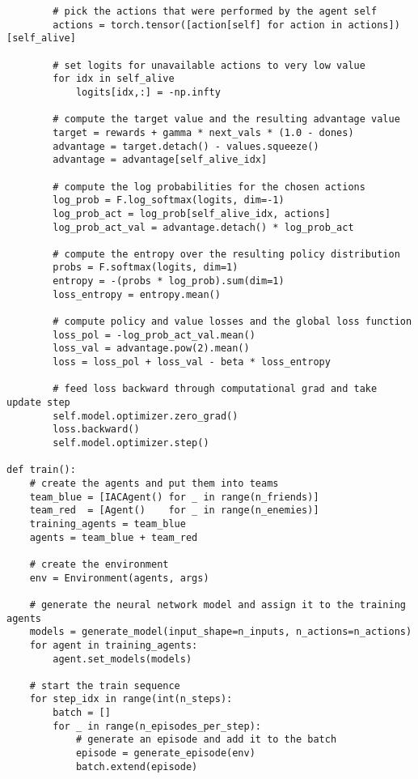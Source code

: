 \begin{appendices}
\begin{verbatim}
        # pick the actions that were performed by the agent self
        actions = torch.tensor([action[self] for action in actions])[self_alive]
        
        # set logits for unavailable actions to very low value
        for idx in self_alive
            logits[idx,:] = -np.infty
        
        # compute the target value and the resulting advantage value
        target = rewards + gamma * next_vals * (1.0 - dones)
        advantage = target.detach() - values.squeeze()
        advantage = advantage[self_alive_idx]        
        
        # compute the log probabilities for the chosen actions
        log_prob = F.log_softmax(logits, dim=-1)
        log_prob_act = log_prob[self_alive_idx, actions]
        log_prob_act_val = advantage.detach() * log_prob_act
        
        # compute the entropy over the resulting policy distribution
        probs = F.softmax(logits, dim=1)
        entropy = -(probs * log_prob).sum(dim=1)
        loss_entropy = entropy.mean()
        
        # compute policy and value losses and the global loss function
        loss_pol = -log_prob_act_val.mean()
        loss_val = advantage.pow(2).mean()
        loss = loss_pol + loss_val - beta * loss_entropy
        
        # feed loss backward through computational grad and take update step
        self.model.optimizer.zero_grad()
        loss.backward()
        self.model.optimizer.step()

def train():
    # create the agents and put them into teams
    team_blue = [IACAgent() for _ in range(n_friends)]
    team_red  = [Agent()    for _ in range(n_enemies)]
    training_agents = team_blue
    agents = team_blue + team_red
    
    # create the environment
    env = Environment(agents, args)

    # generate the neural network model and assign it to the training agents  
    models = generate_model(input_shape=n_inputs, n_actions=n_actions)
    for agent in training_agents:
        agent.set_models(models)

    # start the train sequence
    for step_idx in range(int(n_steps):
        batch = []
        for _ in range(n_episodes_per_step):
            # generate an episode and add it to the batch
            episode = generate_episode(env)
            batch.extend(episode)


\end{verbatim}
\end{appendices}
